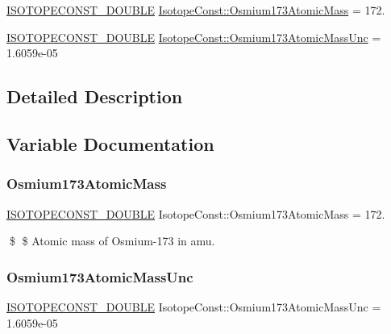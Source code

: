 \begin{DoxyCompactItemize}
\item 
\mbox{\hyperlink{group___isotope_const-_macros_ga8f45a7272ce02c0b4c65c44636ed719a}{I\+S\+O\+T\+O\+P\+E\+C\+O\+N\+S\+T\+\_\+\+D\+O\+U\+B\+LE}} \mbox{\hyperlink{group___isotope_const-_osmium-_os173_ga3165320f6fc9d893d637d3c6af50d5e1}{Isotope\+Const\+::\+Osmium173\+Atomic\+Mass}} = 172.
\item 
\mbox{\hyperlink{group___isotope_const-_macros_ga8f45a7272ce02c0b4c65c44636ed719a}{I\+S\+O\+T\+O\+P\+E\+C\+O\+N\+S\+T\+\_\+\+D\+O\+U\+B\+LE}} \mbox{\hyperlink{group___isotope_const-_osmium-_os173_gac9c3f41e0eed1ddbe17c355a7d74a6da}{Isotope\+Const\+::\+Osmium173\+Atomic\+Mass\+Unc}} = 1.\+6059e-\/05
\end{DoxyCompactItemize}


\subsection{Detailed Description}


\subsection{Variable Documentation}
\mbox{\label{group___isotope_const-_osmium-_os173_ga3165320f6fc9d893d637d3c6af50d5e1}} 
\subsubsection{\texorpdfstring{Osmium173\+Atomic\+Mass}{Osmium173AtomicMass}}
{\footnotesize\ttfamily \mbox{\hyperlink{group___isotope_const-_macros_ga8f45a7272ce02c0b4c65c44636ed719a}{I\+S\+O\+T\+O\+P\+E\+C\+O\+N\+S\+T\+\_\+\+D\+O\+U\+B\+LE}} Isotope\+Const\+::\+Osmium173\+Atomic\+Mass = 172.}

\$ \$ Atomic mass of Osmium-\/173 in amu. \mbox{\label{group___isotope_const-_osmium-_os173_gac9c3f41e0eed1ddbe17c355a7d74a6da}} 
\subsubsection{\texorpdfstring{Osmium173\+Atomic\+Mass\+Unc}{Osmium173AtomicMassUnc}}
{\footnotesize\ttfamily \mbox{\hyperlink{group___isotope_const-_macros_ga8f45a7272ce02c0b4c65c44636ed719a}{I\+S\+O\+T\+O\+P\+E\+C\+O\+N\+S\+T\+\_\+\+D\+O\+U\+B\+LE}} Isotope\+Const\+::\+Osmium173\+Atomic\+Mass\+Unc = 1.\+6059e-\/05}

